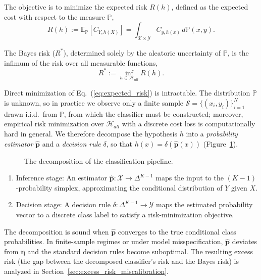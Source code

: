 The objective is to minimize the expected risk $R(h)$, defined as the expected cost with respect to the measure $\mathbb{P}$,
\begin{equation}\label{eq:expected_risk}
    R(h) := \mathbb{E}_{\mathbb{P}} [C_{Y, h(X)}] = \int_{\mathcal{X} \times \mathcal{Y}} C_{y, h(x)} \, d\mathbb{P}(x, y).
\end{equation}

The Bayes risk ($R^*$), determined solely by the aleatoric uncertainty of $\mathbb{P}$, is the infimum of the risk over all measurable functions,
\begin{equation}\label{eq:bayes_risk_def}
    R^* := \inf_{h \in \mathcal{H}_{all}} R(h).
\end{equation}

Direct minimization of Eq.~(\ref{eq:expected_risk}) is intractable. The distribution $\mathbb{P}$ is unknown, so in practice we observe only a finite sample $\mathcal{S} = \{(x_i, y_i)\}_{i=1}^N$ drawn i.i.d.\ from $\mathbb{P}$, from which the classifier must be constructed; moreover, empirical risk minimization over $\mathcal{H}_{all}$ with a discrete cost loss is computationally hard in general. We therefore decompose the hypothesis $h$ into a \textit{probability estimator} $\hat{\mathbf{p}}$ and a \textit{decision rule} $\delta$, so that $h(x) = \delta(\hat{\mathbf{p}}(x))$ (Figure~\ref{fig:pipeline}).

\begin{figure}[H]
    \centering
     
    \caption{The decomposition of the classification pipeline.}\label{fig:pipeline}
\end{figure}

\begin{enumerate}
    \item Inference stage: An estimator $\hat{\mathbf{p}}: \mathcal{X} \to \Delta^{K-1}$ maps the input to the $(K-1)$-probability simplex, approximating the conditional distribution of $Y$ given $X$.
    \item Decision stage: A decision rule $\delta: \Delta^{K-1} \to \mathcal{Y}$ maps the estimated probability vector to a discrete class label to satisfy a risk-minimization objective.
\end{enumerate}

The decomposition is sound when $\hat{\mathbf{p}}$ converges to the true conditional class probabilities. In finite-sample regimes or under model misspecification, $\hat{\mathbf{p}}$ deviates from $\boldsymbol{\eta}$ and the standard decision rules become suboptimal. The resulting excess risk (the gap between the decomposed classifier's risk and the Bayes risk) is analyzed in Section~\ref{sec:excess_risk_miscalibration}.

